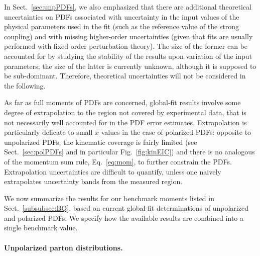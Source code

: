 In Sect.~\ref{sec:unpPDFs}, we also emphasized that there are additional 
theoretical uncertainties on PDFs associated with uncertainty in
the input values of the physical parameters used in the fit (such as the 
reference value of the strong coupling) and with missing higher-order
uncertainties (given that fits are usually performed with fixed-order
perturbation theory).
%
The size of the former can be accounted for by studying the stability of the 
results upon variation of the input parameters; the size of the latter is
currently unknown, although it is supposed to be sub-dominant.
%
Therefore, theoretical uncertainties will not be considered in the following.

As far as full moments of PDFs are concerned, global-fit results involve
some degree of extrapolation to the region not covered by experimental data, 
that is not necessarily well accounted for in the PDF error estimates.
%
Extrapolation is particularly delicate to small $x$ values in the case of 
polarized PDFs: opposite to unpolarized PDFs, the kinematic coverage is 
fairly limited (see Sect.~\ref{sec:polPDFs} and in particular 
Fig.~\ref{fig:kinEIC}) and there is no analogous of the momentum sum rule,
Eq.~\eqref{eq:mom}, to further constrain the PDFs.
%
Extrapolation uncertainties are difficult to quantify, unless
one naively extrapolates uncertainty bands from the measured region.

We now summarize the results for our benchmark moments listed in 
Sect.~\ref{subsubsec:BQ}, based on current global-fit determinations of
unpolarized and polarized PDFs.
%
We specify how the
available results are combined into a single benchmark value.

\paragraph{Unpolarized parton distributions.}

